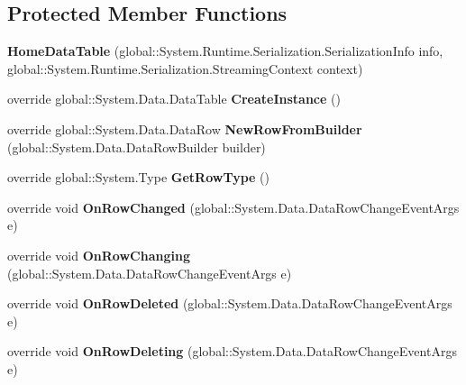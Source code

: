 \subsection*{Protected Member Functions}
\begin{DoxyCompactItemize}
\item 
\textbf{ Home\+Data\+Table} (global\+::\+System.\+Runtime.\+Serialization.\+Serialization\+Info info, global\+::\+System.\+Runtime.\+Serialization.\+Streaming\+Context context)
\item 
override global\+::\+System.\+Data.\+Data\+Table \textbf{ Create\+Instance} ()
\item 
override global\+::\+System.\+Data.\+Data\+Row \textbf{ New\+Row\+From\+Builder} (global\+::\+System.\+Data.\+Data\+Row\+Builder builder)
\item 
override global\+::\+System.\+Type \textbf{ Get\+Row\+Type} ()
\item 
override void \textbf{ On\+Row\+Changed} (global\+::\+System.\+Data.\+Data\+Row\+Change\+Event\+Args e)
\item 
override void \textbf{ On\+Row\+Changing} (global\+::\+System.\+Data.\+Data\+Row\+Change\+Event\+Args e)
\item 
override void \textbf{ On\+Row\+Deleted} (global\+::\+System.\+Data.\+Data\+Row\+Change\+Event\+Args e)
\item 
override void \textbf{ On\+Row\+Deleting} (global\+::\+System.\+Data.\+Data\+Row\+Change\+Event\+Args e)
\end{DoxyCompactItemize}

